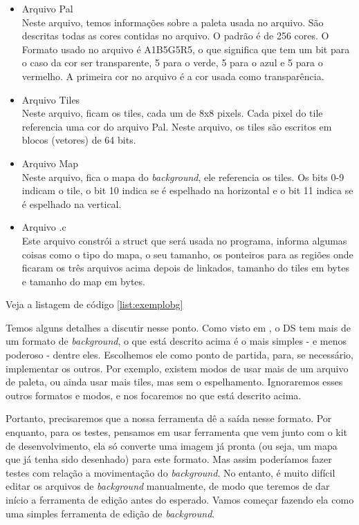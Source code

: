 \documentclass[brazil]{abnt}
\begin{document}
\begin{itemize}
 \item Arquivo Pal\\
 Neste arquivo, temos informações sobre a paleta usada no arquivo. São descritas todas as cores contidas no arquivo. O padrão é de 256 cores. O Formato usado no arquivo é A1B5G5R5, o que significa que tem um bit para o caso da cor ser transparente, 5 para o verde, 5 para o azul e 5 para o vermelho. A primeira cor no arquivo é a cor usada como transparência.
 \item Arquivo Tiles\\
 Neste arquivo, ficam os tiles, cada um de 8x8 pixels. Cada pixel do tile referencia uma cor do arquivo Pal. Neste arquivo, os tiles são escritos em blocos (vetores) de 64 bits. 
 \item Arquivo Map\\
 Neste arquivo, fica o mapa do \textit{background}, ele referencia os tiles. Os bits 0-9 indicam o tile, o bit 10 indica se é espelhado na horizontal e o bit 11 indica se é espelhado na vertical.
 \item Arquivo .c\\
 Este arquivo constrói a struct que será usada no programa, informa algumas coisas como o tipo do mapa, o seu tamanho, os ponteiros para as regiões onde ficaram os três arquivos acima depois de linkados, tamanho do tiles em bytes e tamanho do map em bytes. 
\end{itemize}

Veja a listagem de código \ref{list:exemplobg}

Temos alguns detalhes a discutir nesse ponto. Como visto em \cite{DSSpec}, o DS tem mais de um formato de \textit{background}, o que está descrito acima é o mais simples - e menos poderoso - dentre eles. Escolhemos ele como ponto de partida, para, se necessário, implementar os outros. Por exemplo, existem modos de usar mais de um arquivo de paleta, ou ainda usar mais tiles, mas sem o espelhamento. Ignoraremos esses outros formatos e modos, e nos focaremos no que está descrito acima.

Portanto, precisaremos que a nossa ferramenta dê a saída nesse formato. Por enquanto, para os testes, pensamos em usar ferramenta que vem junto com o kit de desenvolvimento, ela só converte uma imagem já pronta (ou seja, um mapa que já tenha sido desenhado) para este formato. Mas assim poderíamos fazer testes com relação a movimentação do \textit{background}. No entanto, é muito difícil editar os arquivos de \textit{background} manualmente, de modo que teremos de dar início a ferramenta de edição antes do esperado. Vamos começar fazendo ela como uma simples ferramenta de edição de \textit{background}.
\end{document}
